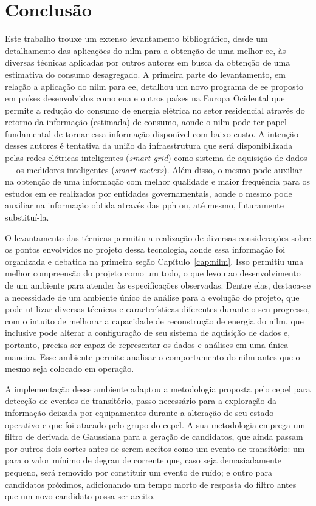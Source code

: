 \chapter{Conclusão}
\label{chap:conclusao}

Este trabalho trouxe um extenso levantamento bibliográfico, desde um
detalhamento das aplicações do \acs{nilm} para a obtenção de uma
melhor \acs{ee}, às diversas técnicas aplicadas por outros autores
em busca da obtenção de uma estimativa do consumo desagregado. A
primeira parte do levantamento, em relação a aplicação do \acs{nilm}
para \acs{ee}, detalhou um novo programa de \acs{ee} proposto em
países desenvolvidos como \acs{eua} e outros países na Europa
Ocidental que permite a redução do consumo de energia elétrica no
setor residencial através do retorno da informação (estimada) de
consumo, aonde o \acs{nilm} pode ter papel fundamental de tornar essa
informação disponível com baixo custo. A intenção desses autores é
tentativa da união da infraestrutura que será disponibilizada pelas
redes elétricas inteligentes (\emph{smart grid}) como sistema de
aquisição de dados --- os medidores inteligentes (\emph{smart
meters}). Além disso, o mesmo pode auxiliar na obtenção de uma
informação com melhor qualidade e maior frequência para os estudos em
\acs{ee} realizados por entidades governamentais, aonde o mesmo pode
auxiliar na informação obtida através das \acf{pph} ou, até mesmo,
futuramente substituí-la.

O levantamento das técnicas permitiu a realização de diversas
considerações sobre os pontos envolvidos no projeto dessa tecnologia,
aonde essa informação foi organizada e debatida na primeira seção
Capítulo~\ref{cap:nilm}. Isso permitiu uma melhor compreensão do
projeto como um todo, o que levou ao desenvolvimento de um ambiente
para atender às especificações observadas. Dentre elas, destaca-se a
necessidade de um ambiente único de análise para a evolução do
projeto, que pode utilizar diversas técnicas e características
diferentes durante o seu progresso, com o intuito de melhorar a
capacidade de reconstrução de energia do \acs{nilm}, que inclusive
pode alterar a configuração de seu sistema de aquisição de dados e,
portanto, precisa ser capaz de representar os dados e análises em uma
única maneira. Esse ambiente permite analisar o comportamento do
\acs{nilm} antes que o mesmo seja colocado em operação.

A implementação desse ambiente adaptou a metodologia proposta pelo
\acs{cepel} para detecção de eventos de transitório, passo necessário
para a exploração da informação deixada por equipamentos durante a
alteração de seu estado operativo e que foi atacado pelo grupo do
\acs{cepel}. A sua metodologia emprega um filtro de derivada de
Gaussiana para a geração de candidatos, que ainda passam por outros
dois cortes antes de serem aceitos como um evento de transitório: um
para o valor mínimo de degrau de corrente que, caso seja
demasiadamente pequeno, será removido por constituir um evento de
ruído; e outro para candidatos próximos, adicionando um tempo morto de
resposta do filtro antes que um novo candidato possa ser aceito.

